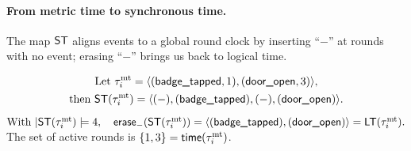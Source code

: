 \documentclass{article}
\begin{document}
  \paragraph{From metric time to synchronous time.}
  The map \(\mathsf{ST}\) aligns events to a global round clock by inserting “\(-\)” at rounds with no event; erasing “\(-\)” brings us back to logical time.
  
  \begin{example}
  \begin{gather*}
  \text{Let }\tau^{\mathrm{mt}}_i=\langle (\textsf{badge\_tapped},1),(\textsf{door\_open},3) \rangle ,\\
  \text{then }\mathsf{ST}(\tau^{\mathrm{mt}}_i)=\langle (-),(\textsf{badge\_tapped}),(-),(\textsf{door\_open}) \rangle .
  \end{gather*}
  $\text{With }|\mathsf{ST}(\tau^{\mathrm{mt}}_i)|=4,\quad
  \mathsf{erase}_{-}(\mathsf{ST}(\tau^{\mathrm{mt}}_i))=\langle (\textsf{badge\_tapped}),(\textsf{door\_open}) \rangle =\mathsf{LT}(\tau^{\mathrm{mt}}_i).
  $\\
  The set of active rounds is \(\{1,3\}=\mathsf{time}(\tau^{\mathrm{mt}}_i)\).
  \end{example}
  
\end{document}
